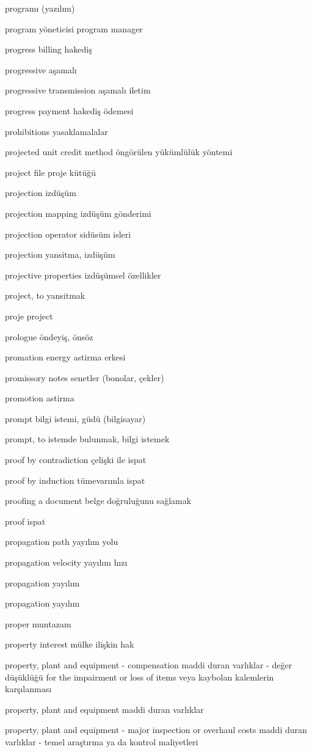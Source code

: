 \documentclass[12pt,fleqn]{article}\usepackage{../../common}
\begin{document}
programı (yazılım)

program yöneticisi program manager

progress billing hakediş

progressive aşamalı

progressive transmission aşamalı iletim

progress payment hakediş ödemesi

prohibitions yasaklamalalar

projected unit credit method öngörülen yükümlülük yöntemi

project file proje kütüğü

projection izdüşüm

projection mapping izdüşüm gönderimi

projection operator sidüsüm isleri

projection yansitma, izdüşüm

projective properties izdüşümsel özellikler

project, to yansitmak

proje project

prologue öndeyiş, önsöz

promation energy astirma erkesi

promissory notes senetler (bonolar, çekler)

promotion astirma

prompt bilgi istemi, güdü (bilgisayar)

prompt, to istemde bulunmak, bilgi istemek

proof by contradiction çelişki ile ispat

proof by induction tümevarımla ispat

proofing a document belge doğruluğunu sağlamak

proof ispat

propagation path yayılım yolu

propagation velocity yayılım hızı

propagation yayılım

propagation yayılım

proper muntazam

property interest mülke ilişkin hak

property, plant and equipment - compensation maddi duran varlıklar - değer düşüklüğü for the impairment or loss of items veya kaybolan kalemlerin karşılanması

property, plant and equipment maddi duran varlıklar

property, plant and equipment - major inspection or overhaul costs maddi duran varlıklar - temel araştırma ya da kontrol maliyetleri
\end{document}
